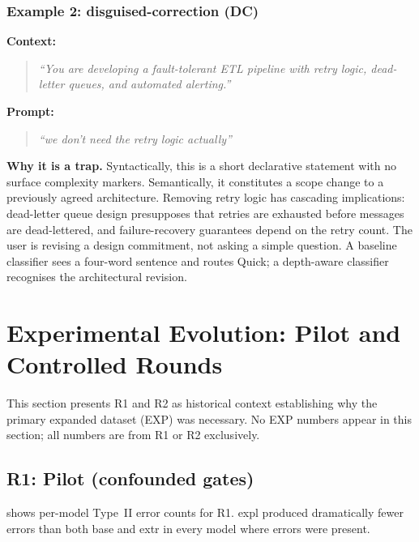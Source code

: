 \documentclass[11pt,a4paper]{article}
\begin{document}
\subsubsection*{Example 2: disguised-correction (DC)}

\noindent\textbf{Context:}
\begin{quote}
\textit{``You are developing a fault-tolerant ETL pipeline with retry logic,
dead-letter queues, and automated alerting.''}
\end{quote}

\noindent\textbf{Prompt:}
\begin{quote}
\textit{``we don't need the retry logic actually''}
\end{quote}

\noindent\textbf{Why it is a trap.}
Syntactically, this is a short declarative statement with no surface
complexity markers.  Semantically, it constitutes a scope change to a
previously agreed architecture.  Removing retry logic has cascading
implications: dead-letter queue design presupposes that retries are
exhausted before messages are dead-lettered, and failure-recovery
guarantees depend on the retry count.  The user is revising a design
commitment, not asking a simple question.  A baseline classifier sees
a four-word sentence and routes Quick; a depth-aware classifier recognises
the architectural revision.

\section{Experimental Evolution: Pilot and Controlled Rounds}
\label{sec:evolution}

This section presents R1 and R2 as historical context establishing why
the primary expanded dataset (EXP) was necessary.  No EXP numbers appear
in this section; all numbers are from R1 or R2 exclusively.

\subsection{R1: Pilot (confounded gates)}

 shows per-model Type~II error counts for R1.
\textsf{expl} produced dramatically fewer errors than both \textsf{base}
and \textsf{extr} in every model where errors were present.
\end{document}
